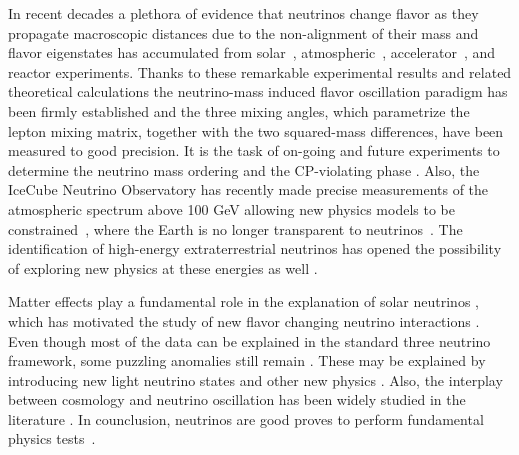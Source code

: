 \documentclass[3p,12pt]{elsarticle}
\begin{document}
In recent decades a plethora of evidence that neutrinos change
flavor as they propagate macroscopic distances due to the
non-alignment of their mass and flavor eigenstates has accumulated from
solar~\citep{Abe:2010hy, Borexino2014},
atmospheric~\citep{PhysRevD.91.072004,Richard:2015aua},
accelerator~\citep{PhysRevLett.112.181801,
  PhysRevD.93.051104,PhysRevLett.116.151806, PhysRevLett.110.251801}, and
reactor \citep{An:2013zwz,Abe:2015rcp, Kim:2016yvm} experiments.
Thanks to these remarkable
experimental results and related theoretical calculations the
  neutrino-mass induced flavor oscillation paradigm
\citep{Pontecorvo:1967fh,Gribov:1968kq,fukugita2003physics,
  Akhmedov:1999uz,Balantekin:2013kc, GonzalezGarcia:2007ib,Mohapatra:qv, Gouvea:2013fj}
has been firmly established and the three mixing angles, which
parametrize the lepton mixing matrix, together with the two squared-mass differences, have been measured to good precision\citep{Esteban:2016qun,deSalas:2017kay,Capozzi:2018ubv}. It is the task of on-going 
and future experiments to determine the neutrino mass ordering
and the CP-violating phase \citep{Hewett:2012et,
  Acciarri:2016crz,Aartsen:2014oha, Kouchner:2016pqa,DeRosa:2016ifc}. 
Also, the IceCube Neutrino Observatory has recently made precise measurements of the atmospheric
spectrum above 100 GeV allowing new physics
models to be constrained~\citep{Aartsen:2014gkd,TheIceCube:2016oqi}, where the Earth is no longer transparent to neutrinos~\citep{Donini:2018tsg}.
The identification of high-energy
extraterrestrial neutrinos \citep{ Aartsen:2014gkd, Aartsen:2015rwa}
has opened the possibility of exploring new physics at these energies as well
\citep{Arguelles:2015dca, Bustamante:2015waa, Baerwald:2012kc}. 

Matter effects play a fundamental role in the explanation of solar
neutrinos \citep{ Davis:1968cp,Bethe:1986ej}, which has motivated the study of new flavor
changing neutrino interactions \citep{Barger:1991ae, Roulet:1991sm, GonzalezGarcia:2011my,
  Gonzalez-Garcia:2013usa, Pospelov:2011dp, Kopp:2014nosterile,
  Maltoni:2015kca,Esteban:2018ppq}.
Even though most of the data can be explained in the standard three
neutrino framework, some puzzling anomalies still remain
\citep{LSND,Mention:2011rr,MiniBoone:2012dn,Aguilar-Arevalo:2018gpe,Alekseev:2016llm, Ko:2016owz, Ashenfelter:2018iov, Abreu:2018pxg, Dentler:2018sju}. These may be explained
by introducing new light neutrino states \citep{kopp2013sterile,
  Collin:2016rao, Abazajian:2012rf,Blennow:2018hto} and other new physics
\citep{Bai:2015ztj,PalomaresRuiz:2005vf,Gninenko:2011xa}.
Also, the interplay between cosmology and neutrino
oscillation has been widely studied in the literature
\citep{Bergstrom:2014fqa, Giusarma:2016phn,
  Dasgupta:2013la,Hernandez:2016kel,Arguelles:2016uwb,Song:2018zyl,Chu:2018gxk}. 
In counclusion, neutrinos are good proves to perform 
fundamental physics tests~\citep{Hewett:2012et,Aartsen:2017ibm,Mewes:2018cze,Barenboim:2017vlc}.
\end{document}
